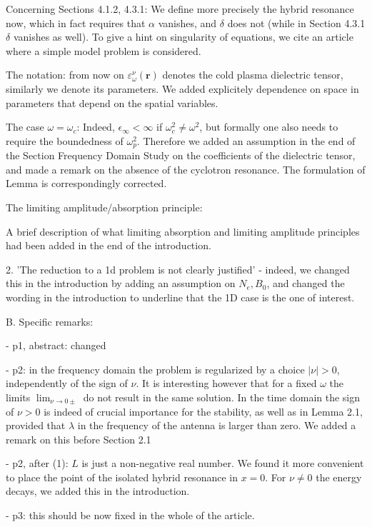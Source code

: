 \documentclass[a4paper,10pt]{article}
\begin{document}
Concerning Sections 4.1.2, 4.3.1: 
We define more precisely the hybrid resonance now, which in fact requires that $\alpha$ vanishes, 
and $\delta$ does not (while in Section 4.3.1 $\delta$ vanishes as well).
To give a hint on singularity of equations, we cite an article where a simple model problem is considered. 


The notation: 
from now on $\varepsilon^{\nu}_{\omega}(\mathbf{r})$ denotes the cold plasma dielectric tensor, similarly we denote its parameters. 
We added explicitely dependence on space in parameters that depend on the spatial variables. 

The case $\omega=\omega_c$:
Indeed, $\epsilon_{\infty}<\infty$ if $\omega_c^2\neq \omega^2$, but formally one also needs to require the boundedness of $\omega_p^2$. Therefore we 
added an assumption in the end of the Section Frequency Domain Study on the coefficients of the dielectric tensor, and made a remark on the absence
of the cyclotron resonance. The formulation of Lemma is correspondingly corrected. 


The limiting amplitude/absorption principle: 

A brief description of what limiting absorption and limiting amplitude principles had been added in the end of the introduction.

2. 'The reduction to a 1d problem is not clearly justified' - indeed, we changed this in the introduction by adding an assumption on $N_e, B_0$, 
and changed the wording in the introduction to underline that the 1D case is the one of interest. 


B. Specific remarks: 

- p1, abstract: changed

- p2: in the frequency domain  the problem is regularized by a choice $|\nu|>0$, independently of the sign of $\nu$. 
It is interesting however that for a fixed $\omega$ the limits $\lim_{\nu\rightarrow 0\pm}$ do not result in the same solution. 
In the time domain the sign of $\nu>0$ is indeed of crucial importance for the stability, as well as in Lemma 2.1, provided that $\lambda$ in the 
frequency of the antenna is larger than zero. We added a remark on this before Section 2.1  

- p2, after (1): $L$ is just a non-negative real number. We found it more convenient to place the point of the isolated hybrid resonance in $x=0$.
For $\nu\neq 0$ the energy decays, we added this in the introduction.


- p3: this should be now fixed in the whole of the article.
\end{document}
